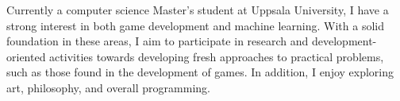 

\begin{cvparagraph}

\vspace{2pt}
Currently a computer science Master's student at Uppsala University, I have a strong interest in both game development and machine learning. With a solid foundation in these areas, I aim to participate in research and development-oriented activities towards developing fresh approaches to practical problems, such as those found in the development of games. In addition, I enjoy exploring art, philosophy, and overall programming.
\end{cvparagraph}
